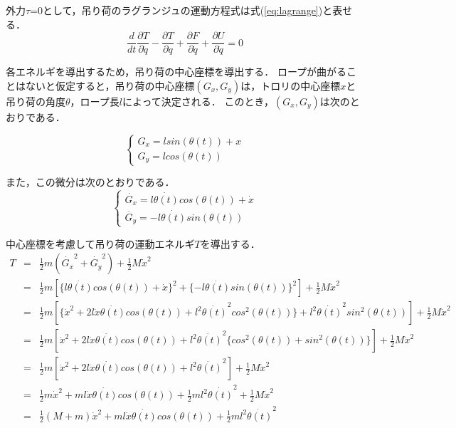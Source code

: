 \documentclass[dvipdfmx,titlepage,a4j]{jsarticle}  %
\begin{document}
外力$\tau$=0として，吊り荷のラグランジュの運動方程式は式(\ref{eq:lagrange})と表せる．
\begin{equation}
  \frac{d}{dt} \frac{\partial T}{\partial \dot{q}} - \frac{\partial T}{\partial q} + \frac{\partial F}{\partial \dot q} + \frac{\partial U}{\partial \dot q} = 0 \label{eq:lagrange}
\end{equation}

各エネルギを導出するため，吊り荷の中心座標を導出する．
ロープが曲がることはないと仮定すると，吊り荷の中心座標$(G_x, G_y)$は，トロリの中心座標$x$と吊り荷の角度$\theta$，ロープ長$l$によって決定される．
このとき，$(G_x, G_y)$は次のとおりである．

\begin{equation}
  \begin{cases}
    G_x = l sin(\theta(t)) + x \nonumber \\
    G_y = l cos(\theta(t))
  \end{cases}
\end{equation}

また，この微分は次のとおりである．
\begin{equation}
  \begin{cases}
    \dot{G_x} = l \dot{\theta(t)} cos(\theta(t)) + \dot x \nonumber \\
    \dot{G_y} = -l \dot{\theta(t)} sin(\theta(t))
  \end{cases}
\end{equation}

中心座標を考慮して吊り荷の運動エネルギ$T$を導出する．
\begin{eqnarray}
  T &=& \frac{1}{2} m (\dot{G_x}^2 + \dot{G_y}^2) + \frac{1}{2}M\dot{x}^2\nonumber \\
  &=& \frac{1}{2} m [ \{l \dot{\theta(t)} cos(\theta(t)) + \dot x\}^2 + \{ -l \dot{\theta(t)} sin(\theta(t))\}^2 ] + \frac{1}{2}M\dot{x}^2 \nonumber \\
  &=& \frac{1}{2} m [\{ \dot x^2 + 2 l \dot{x} \dot{\theta(t)} cos(\theta(t)) + l^2 \dot{\theta(t)}^2 cos^2(\theta(t)) \} + l^2 \dot{\theta(t)}^2 sin^2(\theta(t))] + \frac{1}{2}M\dot{x}^2 \nonumber \\
  &=& \frac{1}{2} m [\dot x^2 + 2 l \dot{x} \dot{\theta(t)} cos(\theta(t)) + l^2 \dot{\theta(t)}^2 \{ cos^2(\theta(t)) + sin^2(\theta(t)) \}] + \frac{1}{2}M\dot{x}^2 \nonumber \\
  &=& \frac{1}{2} m [\dot x^2 + 2 l \dot{x} \dot{\theta(t)} cos(\theta(t)) + l^2 \dot{\theta(t)}^2] + \frac{1}{2}M\dot{x}^2 \nonumber \\
  &=& \frac{1}{2} m \dot x^2 + m l \dot{x} \dot{\theta(t)} cos(\theta(t)) + \frac{1}{2} m l^2 \dot{\theta(t)}^2 + \frac{1}{2}M\dot{x}^2 \nonumber \\
  &=& \frac{1}{2} (M + m)\dot x^2 + m l \dot{x} \dot{\theta(t)} cos(\theta(t)) + \frac{1}{2} m l^2 \dot{\theta(t)}^2 \label{eq:energy}
\end{eqnarray}
\end{document}

